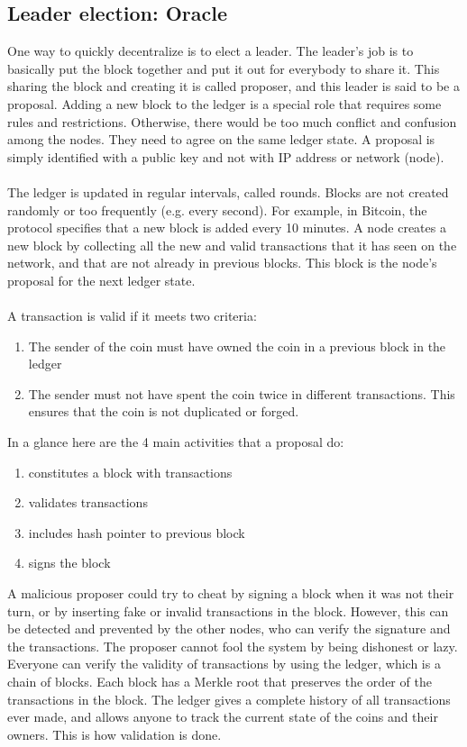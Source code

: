 \documentclass{report}
\begin{document}
\subsection{Leader election: Oracle}
One way to quickly decentralize is to elect a leader. The leader's job is to basically put the block together and put it out for everybody to share it. This sharing the block and creating it is called proposer, and this leader is said to be a proposal. Adding a new block to the ledger is a special role that requires some rules and restrictions. Otherwise, there would be too much conflict and confusion among the nodes. They need to agree on the same ledger state. A proposal is simply identified with a public key and not with IP address or network (node).\\\\
The ledger is updated in regular intervals, called rounds. Blocks are not created randomly or too frequently (e.g. every second). For example, in Bitcoin, the protocol specifies that a new block is added every 10 minutes. A node creates a new block by collecting all the new and valid transactions that it has seen on the network, and that are not already in previous blocks. This block is the node’s proposal for the next ledger state.\\\\
A transaction is valid if it meets two criteria:
\begin{enumerate}
	\item The sender of the coin must have owned the coin in a previous block in the ledger
	\item The sender must not have spent the coin twice in different transactions. This ensures that the coin is not duplicated or forged.
\end{enumerate}
In a glance here are the 4 main activities that a proposal do:
\begin{enumerate}
	\item constitutes a block with transactions
	\item validates transactions
	\item includes hash pointer to previous block
	\item signs the block
\end{enumerate}
A malicious proposer could try to cheat by signing a block when it was not their turn, or by inserting fake or invalid transactions in the block. However, this can be detected and prevented by the other nodes, who can verify the signature and the transactions. The proposer cannot fool the system by being dishonest or lazy. Everyone can verify the validity of transactions by using the ledger, which is a chain of blocks. Each block has a Merkle root that preserves the order of the transactions in the block. The ledger gives a complete history of all transactions ever made, and allows anyone to track the current state of the coins and their owners. This is how validation is done.\\\\
\end{document}

